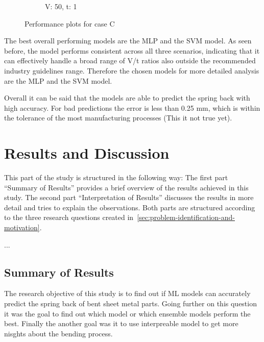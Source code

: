 \begin{figure}[h]
\begin{tcolorbox}[arc=0pt,boxrule=0.5pt]
\begin{subfigure}{0.5\textwidth}
            \caption{V: 50, t: 1}
            \label{fig:performance-50_1}
        \end{subfigure}
    \end{tcolorbox}
    \caption{Performance plots for case C}
    \label{fig:performance-case-c}
\end{figure}

The best overall performing models are the \ac{MLP} and the \ac{SVM} model.
As seen before, the model performs consistent across all three scenarios, indicating that it can
effectively handle a broad range of V/t ratios also outside the recommended industry guidelines
range.
Therefore the chosen models for more detailed analysis are the \ac{MLP} and the \ac{SVM} model.

Overall it can be said that the models are able to predict the spring back with high accuracy.
For bad predictions the error is less than 0.25 mm, which is within the tolerance of the
most manufacturing processes (This it not true yet).


\section{Results and Discussion}\label{sec:results-and-interpretation}
This part of the study is structured in the following way:
The first part ``Summary of Results'' provides a brief overview of the results achieved in this study.
The second part ``Interpretation of Results'' discusses the results in more detail and tries to explain the
observations.
Both parts are structured according to the three research questions created
in~\ref{sec:problem-identification-and-motivation}.

...

\subsection{Summary of Results}\label{subsec:summary-of-results}

The research objective of this study is to find out if \ac{ML} models can accurately predict the spring back of
bent sheet metal parts.
Going further on this question it was the goal to find out which model or which ensemble models perform the best.
Finally the another goal was it to use interpreable model to get more nisghts about the bending process.

